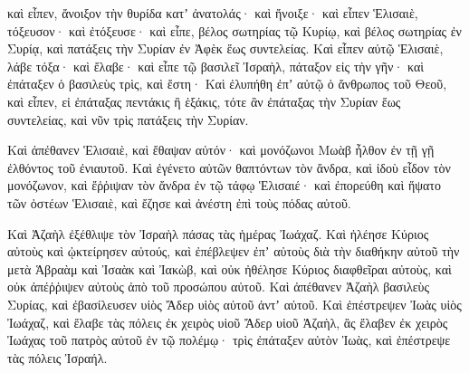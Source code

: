 {καὶ εἶπεν, ἄνοιξον τὴν θυρίδα κατʼ ἀνατολάς· καὶ ἤνοιξε· καὶ εἶπεν Ἑλισαιὲ, τόξευσον· καὶ ἐτόξευσε· καὶ εἶπε, βέλος σωτηρίας τῷ Κυρίῳ, καὶ βέλος σωτηρίας ἐν Συρίᾳ, καὶ πατάξεις τὴν Συρίαν ἐν Ἀφὲκ ἕως συντελείας.
Καὶ εἶπεν αὐτῷ Ἑλισαιὲ, λάβε τόξα· καὶ ἔλαβε· καὶ εἶπε τῷ βασιλεῖ Ἰσραὴλ, πάταξον εἰς τὴν γῆν· καὶ ἐπάταξεν ὁ βασιλεὺς τρὶς, καὶ ἔστη·
Καὶ ἐλυπήθη ἐπʼ αὐτῷ ὁ ἄνθρωπος τοῦ Θεοῦ, καὶ εἶπεν, εἰ ἐπάταξας πεντάκις ἢ ἑξάκις, τότε ἂν ἐπάταξας τὴν Συρίαν ἕως συντελείας, καὶ νῦν τρὶς πατάξεις τὴν Συρίαν.
\par }{\PP {}Καὶ ἀπέθανεν Ἑλισαιὲ, καὶ ἔθαψαν αὐτόν· καὶ μονόζωνοι Μωὰβ ἦλθον ἐν τῇ γῇ ἐλθόντος τοῦ ἐνιαυτοῦ.
Καὶ ἐγένετο αὐτῶν θαπτόντων τὸν ἄνδρα, καὶ ἰδοὺ εἶδον τὸν μονόζωνον, καὶ ἔῤῥιψαν τὸν ἄνδρα ἐν τῷ τάφῳ Ἑλισαιέ· καὶ ἐπορεύθη καὶ ἥψατο τῶν ὀστέων Ἑλισαιὲ, καὶ ἔζησε καὶ ἀνέστη ἐπὶ τοὺς πόδας αὐτοῦ.
\par }{\PP {}Καὶ Ἀζαὴλ ἐξέθλιψε τὸν Ἰσραὴλ πάσας τὰς ἡμέρας Ἰωάχαζ.
Καὶ ἠλέησε Κύριος αὐτοὺς καὶ ᾠκτείρησεν αὐτούς, καὶ ἐπέβλεψεν ἐπʼ αὐτοὺς διὰ τὴν διαθήκην αὐτοῦ τὴν μετὰ Ἁβραὰμ καὶ Ἰσαὰκ καὶ Ἰακὼβ, καὶ οὐκ ἠθέλησε Κύριος διαφθεῖραι αὐτοὺς, καὶ οὐκ ἀπέῤῥιψεν αὐτοὺς ἀπὸ τοῦ προσώπου αὐτοῦ.
Καὶ ἀπέθανεν Ἀζαὴλ βασιλεὺς Συρίας, καὶ ἐβασίλευσεν υἱὸς Ἄδερ υἱὸς αὐτοῦ ἀντʼ αὐτοῦ.
Καὶ ἐπέστρεψεν Ἰωὰς υἱὸς Ἰωάχαζ, καὶ ἔλαβε τὰς πόλεις ἐκ χειρὸς υἱοῦ Ἄδερ υἱοῦ Ἀζαὴλ, ἃς ἔλαβεν ἐκ χειρὸς Ἰωάχας τοῦ πατρὸς αὐτοῦ ἐν τῷ πολέμῳ· τρὶς ἐπάταξεν αὐτὸν Ἰωὰς, καὶ ἐπέστρεψε τὰς πόλεις Ἰσραήλ.

}
